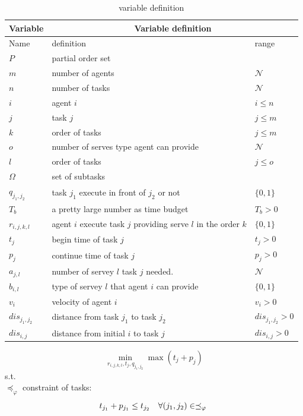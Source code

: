 \begin{table}[h]
	\begin{tabular}{|l|p{}|p{}|}\hline
		Variable &\multicolumn{2}{c|}{ Variable definition }\\\hline
		Name & definition & range \\
		$P$ & partial order set& \\
		$m$  & number of agents & $\mathcal{N}$\\
		$n$ & number of tasks & $\mathcal{N}$ \\
			$i$ & agent $i$ & $i\leq n$\\
		$j$ & task $j$ & $j\leq m$	\\
		$k$ & order of tasks & $j\leq m$\\
		$o$ & number of serves type agent can provide & $ \mathcal{N}$\\
		$l$ & order of tasks & $j\leq o$\\
		$\Omega$ & set of subtasks &\\
		$q_{j_1,j_2}$ &task $j_1$ execute in front of $j_2$ or not& $\{0,1\}$\\
		$T_b$ & a pretty large number as time budget & $T_b>0$ \\ 
		$r_{i,j,k,l}$ & agent $i$ execute task $j$ providing serve $l$ in the order $k$ & $\{0,1\}$\\
		$t_j$ & begin time of task $j$ & $t_j>0$ \\
		$p_j$ & continue time of task $j$ & $p_j >0$\\
		$a_{j,l}$ & number of servey $l$ task $j$ needed. & $\mathcal{N}$\\
		$b_{i,l}$ & type of servey $l$ that agent $i$ can provide & $\{0,1\}$ \\
		$v_i$ & velocity of agent $i$ &   $v_i>0$\\
		$dis_{j_1,j_2}$ & distance from task $j_1$ to task $j_2$ &  $dis_{j_1,j_2}>0$\\
		$dis_{i,j}$ & distance from initial $i$ to task $j$ & $dis_{i,j}>0$\\\hline
	\end{tabular}
	\centering
	\caption{variable definition}
	\label{tab:Margin_settings}
\end{table}
\begin{equation}
\min_{r_{i,j,k,l}, t_j,q_{j_1,j_2}}  \max(t_j+p_j)
\label{0}
\end{equation}
s.t.\\
$\preceq_{\varphi}$ constraint of tasks:
\begin{equation}
t_{j_1}+p_{j_1}\leq t_{j_2} \quad  \forall (j_1,j_2)\in \preceq_{\varphi}\\
\label{1}
\end{equation}
